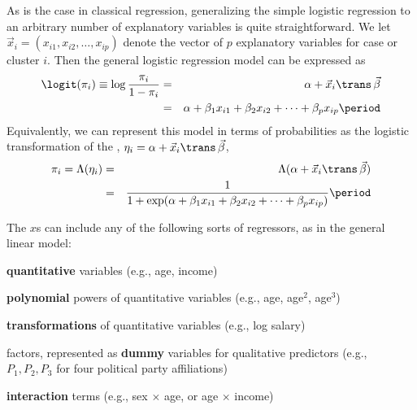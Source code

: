 \documentclass[11pt]{book}
\begin{document}
As is the case in classical regression, generalizing the simple logistic
regression to an arbitrary number of explanatory variables is quite straightforward.
We let $\vec{x}_{i} = ( x_{i1}, x_{i2}, \dots , x_{ip})$ denote the vector
of $p$ explanatory variables for case or cluster $i$. Then the general logistic
regression model can be expressed as
\begin{eqnarray}
  \logit ( \pi_{i}) \equiv \log \frac{\pi_i}{1-\pi_i}
   &=& \alpha + \vec{x}_{i}\trans \,  \vec{\beta} \\ \label{eq:logistm1}
   &=& \alpha + \beta_1 x_{i1} + \beta_2 x_{i2} + \cdots + \beta_p x_{ip} \period
   \nonumber
\end{eqnarray}
Equivalently, we can represent this model in terms of probabilities as the
logistic transformation of the , 
$\eta_i =  \alpha + \vec{x}_{i}\trans \,  \vec{\beta} $,
\begin{eqnarray}
   \pi_{i} = \Lambda (\eta_i) 
   &=& \Lambda (\alpha + \vec{x}_{i}\trans \,  \vec{\beta} ) \\ \label{eq:logistm2}
   &=& \frac{1}{1+ \exp(\alpha + \beta_1 x_{i1} + \beta_2 x_{i2} + \cdots + \beta_p x_{ip})} \period
   \nonumber
\end{eqnarray}

The $x$s can include any of the following sorts of regressors,
as in the general linear model:
\begin{itemize*}
\item \textbf{quantitative} variables (e.g., age, income)
\item \textbf{polynomial} powers of quantitative variables (e.g., age, age$^2$, age$^3$)
\item \textbf{transformations} of quantitative variables (e.g., log salary)
\item factors, represented as \textbf{dummy} variables for qualitative predictors (e.g.,
$P_1, P_2, P_3$ for four political party affiliations)
\item \textbf{interaction} terms (e.g., sex $\times$ age, or age $\times$ income)
\end{itemize*}
\end{document}
